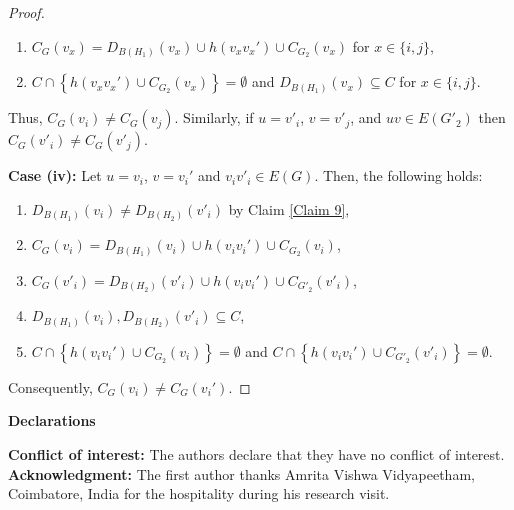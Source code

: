 \documentclass[12pt]{article}
\theoremstyle{definition}
\begin{document}
\begin{proof}
\begin{enumerate}
    \item $C_{G}(v_x)=D_{B(H_1)}(v_x)\cup h(v_xv_x')\cup C_{G_2}(v_x)$ for $x\in \{i,j\}$, 
    
    \item $C 
    \cap
    \left\{
    h(v_xv_x')\cup C_{G_2}(v_x)
    \right\}
    =\emptyset$ and $D_{B(H_1)}(v_x)\subseteq C$ for $x\in \{i,j\}$.
\end{enumerate}
Thus, $C_{G}(v_i)\neq C_{G}(v_j)$.
Similarly, if $u=v'_i$, $v=v'_j$, and $uv\in E(G'_2)$ then $C_{G}(v'_i)\neq C_{G}(v'_j)$.

\textbf{Case (iv):}
Let $u=v_i$, $v=v_i'$ and $v_iv'_i\in E(G)$.
Then, the following holds:
\begin{enumerate}
    \item $D_{B(H_1)}(v_i) \neq D_{B(H_2)} (v'_i)$ by Claim \ref{Claim 9},
    
    \item $C_G(v_i)=D_{B(H_1)}(v_i)\cup h(v_i v_i') \cup C_{G_2}(v_i)$,
    
    \item $C_G(v'_i)=D_{B(H_2)}(v'_i)\cup h(v_i v_i') \cup C_{G'_2}(v'_i)$,
    
    \item $D_{B(H_1)}(v_i), D_{B(H_2)}(v'_i)\subseteq C$,

    \item 
    $C \cap \left\{ h(v_i v_i') \cup C_{G_2}(v_i) \right\} = \emptyset$ and $C \cap \left\{ h(v_i v_i') \cup C_{G'_2}(v'_i) \right\} = \emptyset$.
\end{enumerate}

Consequently, $C_G(v_i) \neq C_G(v_i')$. 
\end{proof}

\textbf{Declarations}

\textbf{Conflict of interest:} The authors declare that they have no conflict of interest.\\

\textbf{Acknowledgment:} The first author thanks Amrita Vishwa Vidyapeetham, Coimbatore, India for the hospitality during his research visit. 
\end{document}

